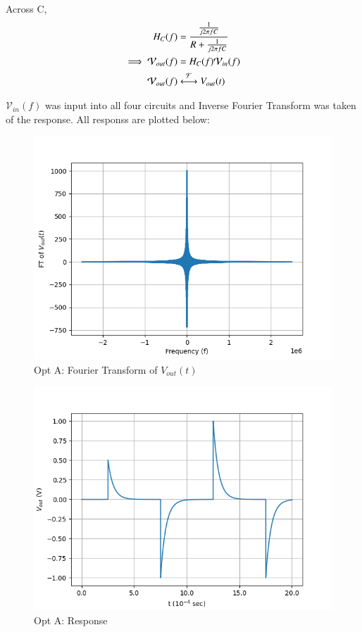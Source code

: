 \documentclass[journal,12pt,twocolumn]{IEEEtran}
\theoremstyle{remark}
\begin{document}
Across C,
\begin{align}
    H_{C}(f) &= \frac{\frac{1}{j2\pi f C}}{R + \frac{1}{j2\pi f C}}\\
    \implies \mathcal{V}_{out}(f) &= H_{C}(f)\mathcal{V}_{in}(f)\\
    \mathcal{V}_{out}(f) &\system{F} V_{out}(t)
\end{align}

$\mathcal{V}_{in}(f)$ was input into all four circuits and Inverse Fourier Transform was taken of the response. All responss are plotted below:
\begin{figure}[!h]
    \centering
    \includegraphics[width = \columnwidth]{figs/opt_a_ft.png}
    \caption{Opt A: Fourier Transform of $V_{out}(t)$}
    \label{fig:a_ft_gate.ph.23.37}
\end{figure}
\begin{figure}[!h]
    \centering
    \includegraphics[width = \columnwidth]{figs/opt_a_res.png}
    \caption{Opt A: Response}
    \label{fig:a_res_gate.ph.23.37}
\end{figure}
\end{document}

